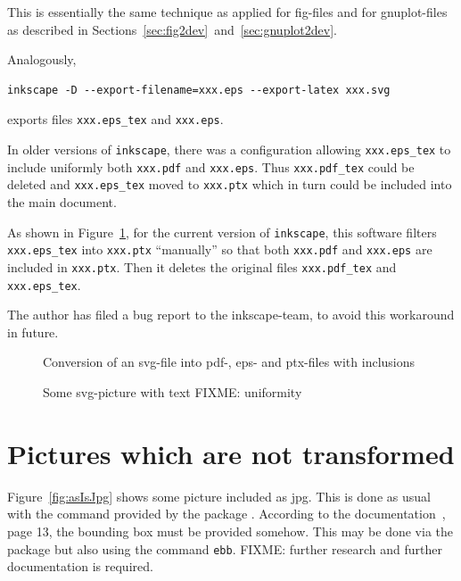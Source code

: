 \documentclass[12pt]{book}
\begin{document}
This is essentially the same technique as applied for fig-files 
and for gnuplot-files as described 
in Sections~\ref{sec:fig2dev}~and~\ref{sec:gnuplot2dev}. 

Analogously,
%
\begin{Verbatim}[fontsize=\normalsize]
inkscape -D --export-filename=xxx.eps --export-latex xxx.svg 
\end{Verbatim}
%
exports files \texttt{xxx.eps\_tex} and \texttt{xxx.eps}.

In older versions of \texttt{inkscape},
there was a configuration allowing \texttt{xxx.eps\_tex}
to include uniformly both \texttt{xxx.pdf} and \texttt{xxx.eps}.
Thus \texttt{xxx.pdf\_tex} could be deleted
and \texttt{xxx.eps\_tex} moved to \texttt{xxx.ptx}
which in turn could be included into the main document.

As shown in Figure~\ref{fig:svg2pdf},
for the current version of \texttt{inkscape},
this software filters \texttt{xxx.eps\_tex} into \texttt{xxx.ptx}
``manually'' so that both \texttt{xxx.pdf} and \texttt{xxx.eps}
are included in \texttt{xxx.ptx}.
Then it deletes the original files
\texttt{xxx.pdf\_tex} and \texttt{xxx.eps\_tex}.

The author has filed a bug report to the inkscape-team,
to avoid this workaround in future. 

\begin{figure}[htb]
\centering
{}
\caption{\label{fig:svg2pdf}Conversion of an svg-file 
into pdf-, eps- and ptx-files with inclusions}
\end{figure}


\begin{figure}[htb]
\centering
\caption{\label{fig:svgWithText}Some svg-picture with text FIXME\@: uniformity  }
\end{figure}


\section{Pictures which are not transformed}\label{sec:picasis}

Figure~\ref{fig:asIsJpg} shows some picture included as jpg. 
This is done as usual with the command 
provided by the package . 
According to the documentation~\cite{GraX}, page 13, 
the bounding box must be provided somehow. 
This may be done via the package  
but also using the command \texttt{ebb}. 
FIXME\@: further research and further documentation is required. 
\end{document}

